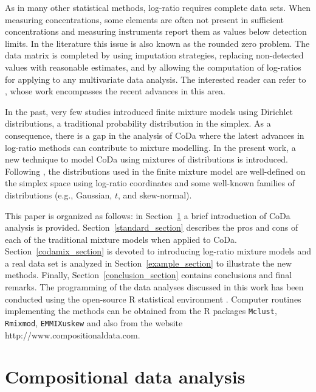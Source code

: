 \documentclass[12pt, a4paper]{article}
\begin{document}
As in many other statistical methods, log-ratio requires complete data sets. When measuring concentrations, some elements are often not present in sufficient concentrations and measuring instruments report them as values below detection limits. In the literature this issue is also known as the rounded zero problem. The data matrix is completed by using imputation strategies, replacing non-detected values with reasonable estimates, and by allowing the computation of log-ratios for applying to any multivariate data analysis. The interested reader can refer to \cite{palarea2014compositional}, whose work encompasses the recent advances in this area.

In the past, very few studies \citep[e.g.,][]{albert1982mixtures, bouguila2004unsupervised} introduced finite mixture models using Dirichlet distributions, a traditional probability distribution in the simplex. As a consequence, there is a gap in the analysis of CoDa where the latest advances in log-ratio methods can contribute to mixture modelling. In the present work, a new technique to model CoDa using mixtures of distributions is introduced. Following \cite{mateu2013normal}, the distributions used in the finite mixture model are well-defined on the simplex space using log-ratio coordinates and some well-known families of distributions (e.g., Gaussian, $t$, and skew-normal).

This paper is organized as follows: in Section~\ref{coda_section} a brief introduction of CoDa analysis is provided. Section~\ref{standard_section} describes the pros and cons of each of the traditional mixture models when applied to CoDa. Section~\ref{codamix_section} is devoted to introducing log-ratio mixture models and a real data set is analyzed in Section~\ref{example_section} to illustrate the new methods. Finally, Section~\ref{conclusion_section} contains conclusions and final remarks. The programming of the data analyses discussed in this work has been conducted using the open-source R statistical environment \citep{R2014soft}. Computer routines implementing the methods can be obtained from the R packages \texttt{Mclust}, \texttt{Rmixmod}, \texttt{EMMIXuskew} and also from the website http://www.compositionaldata.com.




\section{Compositional data analysis}
\label{coda_section}
\end{document}
